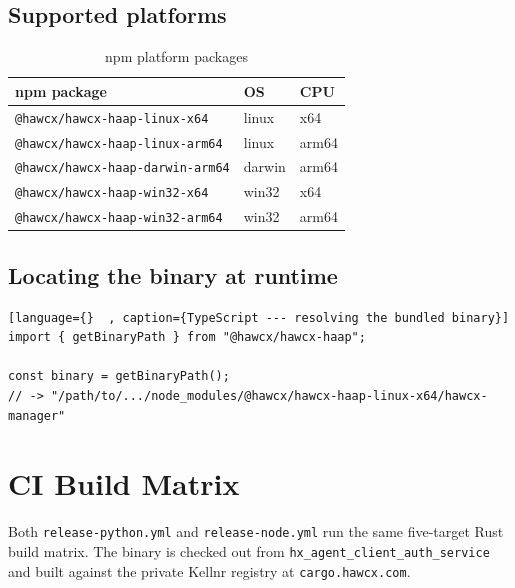 \documentclass[11pt, a4paper]{article}
\newcommand{\code}[1]{\texttt{#1}}
\begin{document}
\subsection{Supported platforms}

\begin{table}[h!]
\centering
\caption{npm platform packages}
\renewcommand{\arraystretch}{1.2}
\begin{tabular}{@{} l l l @{}}
\toprule
\textbf{npm package} & \textbf{OS} & \textbf{CPU} \\
\midrule
\code{@hawcx/hawcx-haap-linux-x64}    & linux  & x64   \\
\code{@hawcx/hawcx-haap-linux-arm64}  & linux  & arm64 \\
\code{@hawcx/hawcx-haap-darwin-arm64} & darwin & arm64 \\
\code{@hawcx/hawcx-haap-win32-x64}    & win32  & x64   \\
\code{@hawcx/hawcx-haap-win32-arm64}  & win32  & arm64 \\
\bottomrule
\end{tabular}
\end{table}

\subsection{Locating the binary at runtime}

\begin{lstlisting}[language={}  , caption={TypeScript --- resolving the bundled binary}]
import { getBinaryPath } from "@hawcx/hawcx-haap";

const binary = getBinaryPath();
// -> "/path/to/.../node_modules/@hawcx/hawcx-haap-linux-x64/hawcx-manager"
\end{lstlisting}

\section{CI Build Matrix}

Both \code{release-python.yml} and \code{release-node.yml} run the same
five-target Rust build matrix. The binary is checked out from
\code{hx\_agent\_client\_auth\_service} and built against the private Kellnr
registry at \code{cargo.hawcx.com}.
\end{document}
